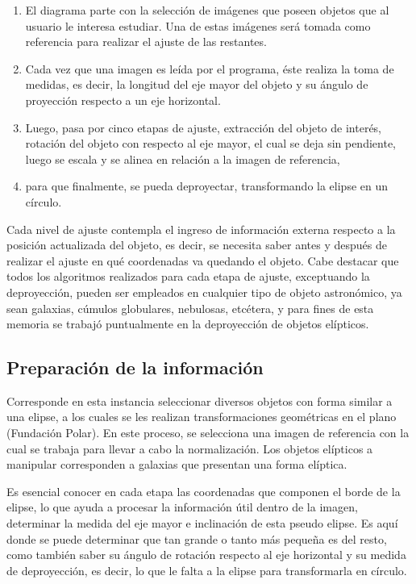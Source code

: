 \begin{enumerate}[I]
  \item El diagrama parte con la selección de imágenes que poseen objetos
    que al usuario le interesa estudiar. Una de estas imágenes será tomada
    como referencia para realizar el ajuste de las restantes. 
  \item Cada vez que una imagen es leída por el programa, éste realiza la
    toma de medidas, es decir, la longitud del eje mayor del objeto y su
    ángulo de proyección respecto a un eje horizontal. 
  \item Luego, pasa por cinco etapas de ajuste,  extracción del objeto de
    interés, rotación del objeto con respecto al eje mayor, el cual se
    deja sin pendiente, luego se escala y se alinea en relación a la
    imagen de referencia, 
  \item para que finalmente, se pueda deproyectar, transformando la elipse
    en un círculo.
\end{enumerate}

Cada nivel de ajuste contempla el ingreso de información externa
respecto a la posición actualizada del objeto, es decir, se necesita
saber antes y después de realizar el ajuste en qué coordenadas va
quedando el objeto. Cabe destacar que todos los algoritmos realizados
para cada etapa de ajuste, exceptuando la deproyección, pueden ser
empleados en cualquier tipo de objeto astronómico, ya sean galaxias,
cúmulos globulares, nebulosas, etcétera, y para fines de esta memoria
se trabajó puntualmente en la deproyección de objetos elípticos.



\subsection{Preparación de la información}

Corresponde en esta instancia seleccionar diversos objetos con forma
similar a una elipse, a los cuales se les realizan transformaciones
geométricas en el plano (Fundación Polar). En este proceso, se
selecciona una imagen de referencia con la cual se trabaja para llevar
a cabo la normalización. Los objetos elípticos a manipular
corresponden a galaxias que presentan una forma elíptica.

Es esencial conocer en cada etapa las coordenadas que componen el
borde de la elipse, lo que ayuda a procesar la información útil dentro
de la imagen, determinar la medida del eje mayor e inclinación de esta
pseudo elipse. Es aquí donde se puede  determinar que tan grande o
tanto más pequeña es del resto, como también saber su ángulo de
rotación respecto al eje horizontal y su medida de deproyección, es
decir, lo que le falta a la elipse para transformarla en círculo.

